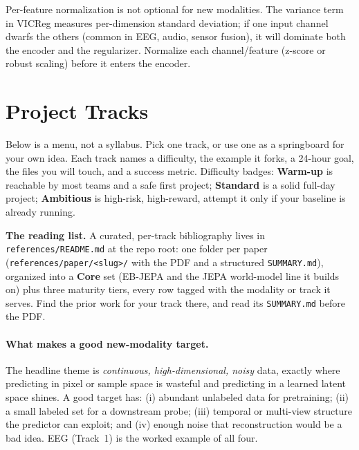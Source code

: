 \documentclass{article}
\newcommand{\code}[1]{\texttt{\small #1}}
\newcommand{\diffeasy}{\colorbox{ebgreen!18}{\textcolor{ebgreen}{\small\bfseries Warm-up}}}
\newcommand{\diffmed}{\colorbox{ebamber!18}{\textcolor{ebamber}{\small\bfseries Standard}}}
\newcommand{\diffhard}{\colorbox{ebred!15}{\textcolor{ebred}{\small\bfseries Ambitious}}}
\begin{document}
\begin{gotchabox}
Per-feature normalization is not optional for new modalities. The variance term in
VICReg measures per-dimension standard deviation; if one input channel dwarfs the
others (common in EEG, audio, sensor fusion), it will dominate both the encoder and
the regularizer. Normalize each channel/feature (z-score or robust scaling) before
it enters the encoder.
\end{gotchabox}
\section{Project Tracks}
\label{sec:tracks}

Below is a menu, not a syllabus. Pick one track, or use one as a springboard for
your own idea. Each track names a difficulty, the example it forks, a 24-hour
goal, the files you will touch, and a success metric. Difficulty badges:
\diffeasy{} is reachable by most teams and a safe first project; \diffmed{} is a
solid full-day project; \diffhard{} is high-risk, high-reward, attempt it only if
your baseline is already running.

\begin{notebox}
\textbf{The reading list.} A curated, per-track bibliography lives in
\code{references/README.md} at the repo root: one folder per paper
(\code{references/paper/<slug>/} with the PDF and a structured \code{SUMMARY.md}),
organized into a \textbf{Core} set (EB-JEPA and the JEPA world-model line it builds
on) plus three maturity tiers, every row tagged with the modality or track it
serves. Find the prior work for your track there, and read its \code{SUMMARY.md}
before the PDF.
\end{notebox}

\paragraph{What makes a good new-modality target.} The headline theme is
\emph{continuous, high-dimensional, noisy} data, exactly where predicting in pixel
or sample space is wasteful and predicting in a learned latent space shines. A
good target has: (i) abundant unlabeled data for pretraining; (ii) a small labeled
set for a downstream probe; (iii) temporal or multi-view structure the predictor
can exploit; and (iv) enough noise that reconstruction would be a bad idea. EEG
(Track~1) is the worked example of all four.

\end{document}
